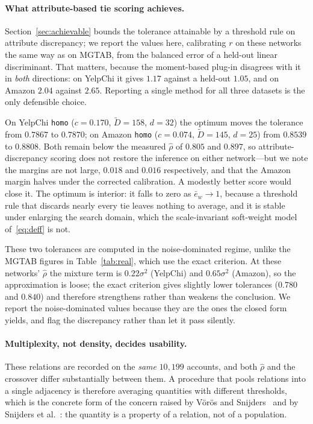 \documentclass[onecolumn,pdflatex,sn-basic,Numbered]{sn-jnl}
\theoremstyle{thmstyleone}
\theoremstyle{thmstylethree}
\begin{document}
\paragraph{What attribute-based tie scoring achieves.}
Section~\ref{sec:achievable} bounds the tolerance attainable by a threshold rule on
attribute discrepancy; we report the values here, calibrating $r$ on these networks the
same way as on MGTAB, from the balanced error of a held-out linear discriminant. That
matters, because the moment-based plug-in disagrees with it in \emph{both} directions:
on YelpChi it gives $1.17$ against a held-out $1.05$, and on Amazon $2.04$ against
$2.65$. Reporting a single method for all three datasets is the only defensible choice.

On YelpChi \texttt{homo} ($c=0.170$, $\tilde D=158$, $d=32$) the optimum moves the
tolerance from $0.7867$ to $0.7870$; on Amazon \texttt{homo} ($c=0.074$, $\tilde D=145$,
$d=25$) from $0.8539$ to $0.8808$. Both remain below the measured $\hat\rho$ of $0.805$
and $0.897$, so attribute-discrepancy scoring does not restore the inference on either
network---but we note the margins are not large, $0.018$ and $0.016$ respectively, and
that the Amazon margin halves under the corrected calibration. A modestly better score
would close it. The optimum is interior: it falls to zero as $\bar e_w \to 1$, because a
threshold rule that discards nearly every tie leaves nothing to average, and it is
stable under enlarging the search domain, which the scale-invariant soft-weight model
of~\eqref{eq:deff} is not.

These two tolerances are computed in the noise-dominated regime, unlike the MGTAB
figures in Table~\ref{tab:real}, which use the exact criterion. At these networks'
$\hat\rho$ the mixture term is $0.22\sigma^2$ (YelpChi) and $0.65\sigma^2$ (Amazon), so
the approximation is loose; the exact criterion gives slightly lower tolerances
($0.780$ and $0.840$) and therefore strengthens rather than weakens the conclusion. We
report the noise-dominated values because they are the ones the closed form yields, and
flag the discrepancy rather than let it pass silently.

\paragraph{Multiplexity, not density, decides usability.} These relations are recorded
on the \emph{same} $10{,}199$ accounts, and both $\hat\rho$ and the crossover differ
substantially between them. A procedure that pools relations into a single adjacency
is therefore averaging quantities with different thresholds, which is the concrete
form of the concern raised by V\"or\"os and Snijders~\citep{voros2017cluster} and by
Snijders et al.~\citep{snijders2013model}: the quantity is a property of a relation,
not of a population.
\end{document}
